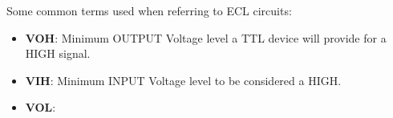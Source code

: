 Some common terms used when referring to ECL circuits:
\begin{itemize}
\item \textbf{VOH}: Minimum OUTPUT Voltage level a TTL device will provide for a HIGH signal.
\item \textbf{VIH}: Minimum INPUT Voltage level to be considered a HIGH.
\item \textbf{VOL}:
\end{itemize}
